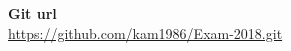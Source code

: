 \documentclass[a4paper]{article}
\begin{document}
\maketitle


\center\textbf{Git url}\\
\center\url{https://github.com/kam1986/Exam-2018.git}\\

\newpage
















\end{document}
